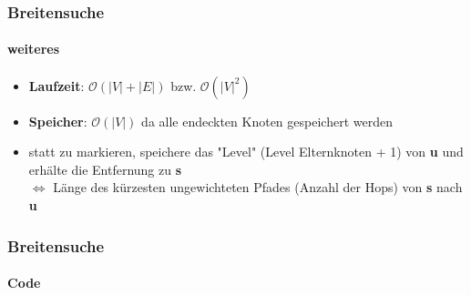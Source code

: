 \begin{frame}
    \frametitle{Breitensuche}
    \framesubtitle{weiteres}
    \begin{itemize}
        \item \textbf{Laufzeit}: \( \mathcal{O}(|V| + |E|)\) bzw. \( \mathcal{O}(|V|^2)\)
        \item \textbf{Speicher}: \( \mathcal{O}(|V|)\) da alle endeckten Knoten gespeichert werden
        \item statt zu markieren, speichere das "Level" (Level Elternknoten + 1) von \textbf{u} und erhälte die Entfernung zu \textbf{s} \\\(\iff\) Länge des kürzesten ungewichteten Pfades (Anzahl der Hops) von \textbf{s} nach \textbf{u}
    \end{itemize}
\end{frame}
\begin{frame}
    \frametitle{Breitensuche}
    \framesubtitle{Code}
    
    
\end{frame}
